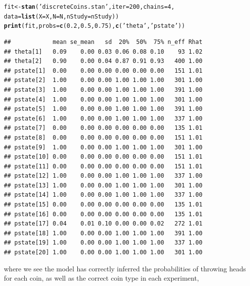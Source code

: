 \documentclass[11pt,fullpage]{book}
\makeatletter
\newenvironment{kframe}{%
	\def\at@end@of@kframe{}%
	\ifinner\ifhmode%
	\def\at@end@of@kframe{\end{minipage}}%
\begin{minipage}{\columnwidth}%
	\fi\fi%
	\def\FrameCommand##1{\hskip\@totalleftmargin \hskip-\fboxsep
		\colorbox{shadecolor}{##1}\hskip-\fboxsep
		\hskip-\linewidth \hskip-\@totalleftmargin \hskip\columnwidth}%
	\MakeFramed {\advance\hsize-\width
		\@totalleftmargin\z@ \linewidth\hsize
		\@setminipage}}%
{\par\unskip\endMakeFramed%
	\at@end@of@kframe}
\newcommand{\hlnum}[1]{\textcolor[rgb]{0.686,0.059,0.569}{#1}}%
\newcommand{\hlstr}[1]{\textcolor[rgb]{0.192,0.494,0.8}{#1}}%
\newcommand{\hlstd}[1]{\textcolor[rgb]{0.345,0.345,0.345}{#1}}%
\newcommand{\hlkwb}[1]{\textcolor[rgb]{0.69,0.353,0.396}{#1}}%
\newcommand{\hlkwc}[1]{\textcolor[rgb]{0.333,0.667,0.333}{#1}}%
\newcommand{\hlkwd}[1]{\textcolor[rgb]{0.737,0.353,0.396}{\textbf{#1}}}%
\newenvironment{knitrout}{}{} %
\makeatother
\begin{document}
\begin{knitrout}\small
		\color{fgcolor}\begin{kframe}
\begin{alltt}
\hlstd{fit} \hlkwb{<-} \hlkwd{stan}\hlstd{(}\hlstr{'discreteCoins.stan'}\hlstd{,}\hlkwc{iter}\hlstd{=}\hlnum{200}\hlstd{,}\hlkwc{chains}\hlstd{=}\hlnum{4}\hlstd{,}
            \hlkwc{data}\hlstd{=}\hlkwd{list}\hlstd{(}\hlkwc{X}\hlstd{=X,}\hlkwc{N}\hlstd{=N,}\hlkwc{nStudy}\hlstd{=nStudy))}
\hlkwd{print}\hlstd{(fit,}\hlkwc{probs} \hlstd{=} \hlkwd{c}\hlstd{(}\hlnum{0.2}\hlstd{,}\hlnum{0.5}\hlstd{,}\hlnum{0.75}\hlstd{),}\hlkwd{c}\hlstd{(}\hlstr{'theta'}\hlstd{,}\hlstr{'pstate'}\hlstd{))}
\end{alltt}
			\begin{verbatim}
##            mean se_mean   sd  20%  50%  75% n_eff Rhat
## theta[1]   0.09    0.00 0.03 0.06 0.08 0.10    93 1.02
## theta[2]   0.90    0.00 0.04 0.87 0.91 0.93   400 1.00
## pstate[1]  0.00    0.00 0.00 0.00 0.00 0.00   151 1.01
## pstate[2]  1.00    0.00 0.00 1.00 1.00 1.00   301 1.00
## pstate[3]  1.00    0.00 0.00 1.00 1.00 1.00   391 1.00
## pstate[4]  1.00    0.00 0.00 1.00 1.00 1.00   301 1.00
## pstate[5]  1.00    0.00 0.00 1.00 1.00 1.00   391 1.00
## pstate[6]  1.00    0.00 0.00 1.00 1.00 1.00   337 1.00
## pstate[7]  0.00    0.00 0.00 0.00 0.00 0.00   135 1.01
## pstate[8]  0.00    0.00 0.00 0.00 0.00 0.00   151 1.01
## pstate[9]  1.00    0.00 0.00 1.00 1.00 1.00   301 1.00
## pstate[10] 0.00    0.00 0.00 0.00 0.00 0.00   151 1.01
## pstate[11] 0.00    0.00 0.00 0.00 0.00 0.00   151 1.01
## pstate[12] 1.00    0.00 0.00 1.00 1.00 1.00   337 1.00
## pstate[13] 1.00    0.00 0.00 1.00 1.00 1.00   301 1.00
## pstate[14] 1.00    0.00 0.00 1.00 1.00 1.00   337 1.00
## pstate[15] 0.00    0.00 0.00 0.00 0.00 0.00   135 1.01
## pstate[16] 0.00    0.00 0.00 0.00 0.00 0.00   135 1.01
## pstate[17] 0.04    0.01 0.10 0.00 0.00 0.02   272 1.01
## pstate[18] 1.00    0.00 0.00 1.00 1.00 1.00   391 1.00
## pstate[19] 1.00    0.00 0.00 1.00 1.00 1.00   337 1.00
## pstate[20] 1.00    0.00 0.00 1.00 1.00 1.00   301 1.00
			\end{verbatim}
		\end{kframe}
	\end{knitrout}

where we see the model has correctly inferred the probabilities of throwing heads for each coin, as well as the correct coin type in each experiment,
\end{document}
